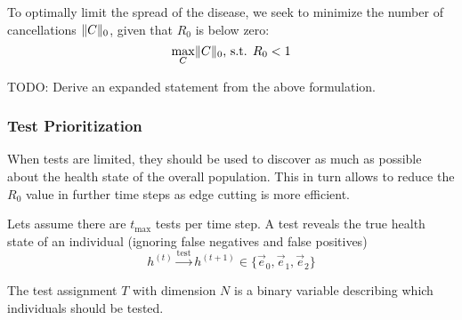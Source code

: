 To optimally limit the spread of the disease, we seek to minimize the number of cancellations $\lVert C\rVert_0$, given that $R_0$ is below zero:
\begin{equation}
	\max_{C} \lVert C\rVert_0\text{, s.t. }R_0 < 1
\end{equation}

TODO: Derive an expanded statement from the above formulation.\\

\subsubsection{Test Prioritization}
When tests are limited, they should be used to discover as much as possible about the health state of the overall population.
This in turn allows to reduce the $R_0$ value in further time steps as edge cutting is more efficient.

Lets assume there are $t_{\text{max}}$ tests per time step.
A test reveals the true health state of an individual (ignoring false negatives and false positives)
\begin{equation}
	h^{(t)} \xrightarrow{\text{test}} h^{(t+1)} \in \{\vec{e}_0, \vec{e}_1, \vec{e}_2 \}
\end{equation}

The test assignment $T$ with dimension $N$ is a binary variable describing which individuals should be tested.